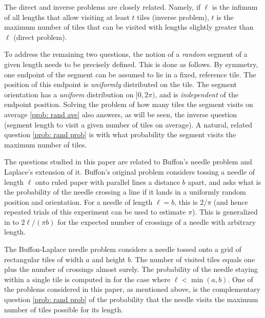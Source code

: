 \documentclass[12pt, a4paper]{article}
\newcommand{\len}{\ell} %
\newcommand{\tiles}{t} %
\begin{document}
The direct and inverse problems are closely related. Namely, if $\len$ is the infimum of all lengths that allow visiting at least $\tiles$ tiles (inverse problem), $\tiles$ is the maximum number of tiles that can be visited with lengths slightly greater than $\len$ (direct problem).

To address the remaining two questions, the notion of a \emph{random} segment of a given length needs to be precisely defined. This is done as follows. By symmetry, one endpoint of the segment can be assumed to lie in a fixed, reference tile. The position of this endpoint is \emph{uniformly} distributed on the tile. The segment orientation has a \emph{uniform} distribution on $[0,2\pi)$, and is \emph{independent} of the endpoint position. Solving the problem of how many tiles the segment visits on average \ref{prob: rand ave} also answers, as will be seen, the inverse question (segment length to visit a given number of tiles on average). A natural, related question \ref{prob: rand prob} is with what probability the segment visits the maximum number of tiles. 


The questions studied in this paper are related to Buffon's needle problem and Laplace's extension of it. Buffon's original problem considers tossing a needle of length $\len$ onto ruled paper with parallel lines a distance $b$ apart, and asks what is the probability of the needle crossing a line if it lands in a uniformly random position and orientation. For a needle of length $\len = b$, this is $2/\pi$ (and hence repeated trials of this experiment can be used to estimate $\pi$). This is generalized in \cite{Ramaley69} to $2\len /(\pi b)$ for the expected number of crossings of a needle with arbitrary length.

The Buffon-Laplace needle problem \cite[section 1.1]{Mathai99} considers a needle tossed onto a grid of rectangular tiles of width $a$ and height $b$. The number of visited tiles equals one plus the number of crossings almost surely. The probability of the needle staying within a single tile is computed in \cite{Arnow94} for the case where $\len < \min(a,b)$. One of the problems considered in this paper, as mentioned above, is the complementary question \ref{prob: rand prob} of the probability that the needle visits the maximum number of tiles possible for its length.
\end{document}
